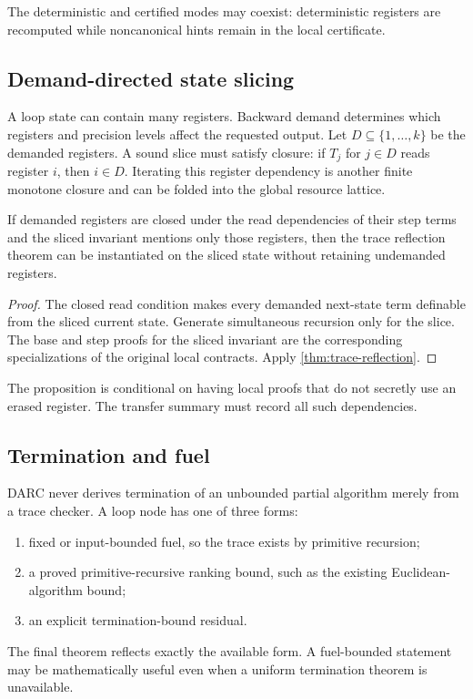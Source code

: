 The deterministic and certified modes may coexist: deterministic registers
are recomputed while noncanonical hints remain in the local certificate.

\subsection{Demand-directed state slicing}

A loop state can contain many registers.  Backward demand determines which
registers and precision levels affect the requested output.  Let
\(D\subseteq\{1,\ldots,k\}\) be the demanded registers.  A sound slice must
satisfy closure: if \(T_j\) for \(j\in D\) reads register \(i\), then
\(i\in D\).  Iterating this register dependency is another finite monotone
closure and can be folded into the global resource lattice.

\begin{proposition}
\label{prop:loop-slicing}
If demanded registers are closed under the read dependencies of their step
terms and the sliced invariant mentions only those registers, then the trace
reflection theorem can be instantiated on the sliced state without retaining
undemanded registers.
\end{proposition}

\begin{proof}
The closed read condition makes every demanded next-state term definable from
the sliced current state.  Generate simultaneous recursion only for the slice.
The base and step proofs for the sliced invariant are the corresponding
specializations of the original local contracts.  Apply
\cref{thm:trace-reflection}.
\end{proof}

The proposition is conditional on having local proofs that do not secretly use
an erased register.  The transfer summary must record all such dependencies.

\subsection{Termination and fuel}

DARC never derives termination of an unbounded partial algorithm merely from a
trace checker.  A loop node has one of three forms:
\begin{enumerate}
  \item fixed or input-bounded fuel, so the trace exists by primitive
        recursion;
  \item a proved primitive-recursive ranking bound, such as the existing
        Euclidean-algorithm bound;
  \item an explicit termination-bound residual.
\end{enumerate}
The final theorem reflects exactly the available form.  A fuel-bounded
statement may be mathematically useful even when a uniform termination theorem
is unavailable.

